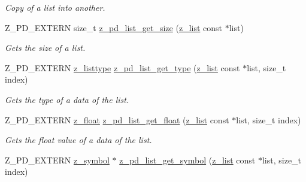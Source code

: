 \begin{DoxyCompactItemize}
\begin{DoxyCompactList}\small\item\em Copy of a list into another. \end{DoxyCompactList}\item 
\hypertarget{group__zpd_ga032f448c30270f901ba62d91abd579f2}{Z\-\_\-\-P\-D\-\_\-\-E\-X\-T\-E\-R\-N size\-\_\-t \hyperlink{group__zpd_ga032f448c30270f901ba62d91abd579f2}{z\-\_\-pd\-\_\-list\-\_\-get\-\_\-size} (\hyperlink{struct__list}{z\-\_\-list} const $\ast$list)}\label{group__zpd_ga032f448c30270f901ba62d91abd579f2}

\begin{DoxyCompactList}\small\item\em Gets the size of a list. \end{DoxyCompactList}\item 
\hypertarget{group__zpd_ga1cda841346f68ced490ee6737fa764d3}{Z\-\_\-\-P\-D\-\_\-\-E\-X\-T\-E\-R\-N \hyperlink{group__zpd_ga88e6eaf6d7bd0aed886cfc104e2c8c7c}{z\-\_\-listtype} \hyperlink{group__zpd_ga1cda841346f68ced490ee6737fa764d3}{z\-\_\-pd\-\_\-list\-\_\-get\-\_\-type} (\hyperlink{struct__list}{z\-\_\-list} const $\ast$list, size\-\_\-t index)}\label{group__zpd_ga1cda841346f68ced490ee6737fa764d3}

\begin{DoxyCompactList}\small\item\em Gets the type of a data of the list. \end{DoxyCompactList}\item 
\hypertarget{group__zpd_ga13f1f88188dc67843f18574fd293ad1b}{Z\-\_\-\-P\-D\-\_\-\-E\-X\-T\-E\-R\-N \hyperlink{group__zpd_ga86e16508ee69192343f6f6ad26fcef55}{z\-\_\-float} \hyperlink{group__zpd_ga13f1f88188dc67843f18574fd293ad1b}{z\-\_\-pd\-\_\-list\-\_\-get\-\_\-float} (\hyperlink{struct__list}{z\-\_\-list} const $\ast$list, size\-\_\-t index)}\label{group__zpd_ga13f1f88188dc67843f18574fd293ad1b}

\begin{DoxyCompactList}\small\item\em Gets the float value of a data of the list. \end{DoxyCompactList}\item 
\hypertarget{group__zpd_gab9610bea0d12a93d58a222903e01fb3e}{Z\-\_\-\-P\-D\-\_\-\-E\-X\-T\-E\-R\-N \hyperlink{group__zpd_ga43e609e9bccc7a2018b8f16558b9494c}{z\-\_\-symbol} $\ast$ \hyperlink{group__zpd_gab9610bea0d12a93d58a222903e01fb3e}{z\-\_\-pd\-\_\-list\-\_\-get\-\_\-symbol} (\hyperlink{struct__list}{z\-\_\-list} const $\ast$list, size\-\_\-t index)}\label{group__zpd_gab9610bea0d12a93d58a222903e01fb3e}


\end{DoxyCompactItemize}
